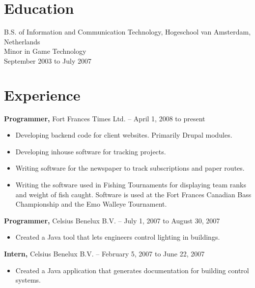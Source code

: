 \documentclass{res}
\begin{document}
\address{Box 241\\Devlin, ON\\P0W 1C0\\(807) 486-1566\\
  bram@vanderkroef.net\\http://vanderkroef.net\\github.com/BramvdKroef}

\begin{resume}
  
\section{Education}
\label{sec:edu}
B.S. of Information and Communication Technology, Hogeschool van
Amsterdam, Netherlands \\
Minor in Game Technology\\
September 2003 to July 2007

\section{Experience}
\label{sec:experience}

{\bf Programmer,} Fort Frances Times Ltd. -- April 1, 2008 to present
\begin{itemize} \itemsep -2pt
\item Developing backend code for client websites. Primarily Drupal
  modules.
\item Developing inhouse software for tracking projects.
\item Writing software for the newspaper to track subscriptions and paper
  routes. 
\item Writing the software used in Fishing Tournaments for displaying
  team ranks and weight of fish caught. Software is used at the Fort
  Frances Canadian Bass Championship and the Emo Walleye Tournament.
\end{itemize}

{\bf Programmer,} Celsius Benelux B.V. -- July 1, 2007 to August 30, 2007
\begin{itemize} \itemsep -2pt
\item Created a Java tool that lets engineers control lighting in buildings.
\end{itemize}

{\bf Intern,} Celsius Benelux B.V. -- February 5, 2007 to June 22, 2007
\begin{itemize} \itemsep -2pt
\item Created a Java application that generates documentation for
  building control systems.
\end{itemize}


\end{resume}
\end{document}
